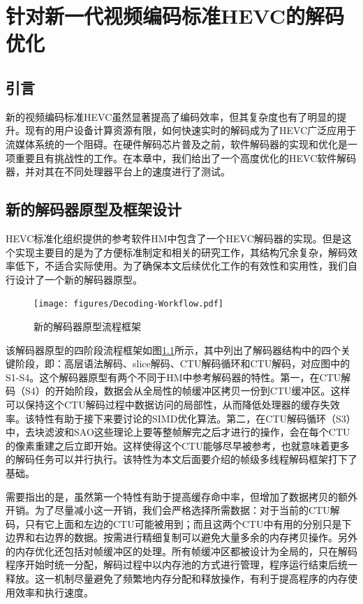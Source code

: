 \chapter{针对新一代视频编码标准HEVC的解码优化}

\section{引言}

新的视频编码标准HEVC虽然显著提高了编码效率，但其复杂度也有了明显的提升。现有的用户设备计算资源有限，如何快速实时的解码成为了HEVC广泛应用于流媒体系统的一个阻碍。在硬件解码芯片普及之前，软件解码器的实现和优化是一项重要且有挑战性的工作。在本章中，我们给出了一个高度优化的HEVC软件解码器，并对其在不同处理器平台上的速度进行了测试。

\section{新的解码器原型及框架设计}

HEVC标准化组织提供的参考软件HM中包含了一个HEVC解码器的实现。但是这个实现主要目的是为了方便标准制定和相关的研究工作，其结构冗余复杂，解码效率低下，不适合实际使用。为了确保本文后续优化工作的有效性和实用性，我们自行设计了一个新的解码器原型。

\begin{figure}[t]
	\centering
	\texttt{[image: figures/Decoding-Workflow.pdf]}\\
	\caption{\label{fig:decoding_workflow}新的解码器原型流程框架}
\end{figure}

该解码器原型的四阶段流程框架如图\ref{fig:decoding_workflow}所示，其中列出了解码器结构中的四个关键阶段，即：高层语法解码、slice解码、CTU解码循环和CTU解码，对应图中的S1-S4。这个解码器原型有两个不同于HM中参考解码器的特性。第一，在CTU解码（S4）的开始阶段，数据会从全局性的帧缓冲区拷贝一份到CTU缓冲区。这样可以保持这个CTU解码过程中数据访问的局部性，从而降低处理器的缓存失效率。该特性有助于接下来要讨论的SIMD优化算法。第二，在CTU解码循环（S3）中，去块滤波和SAO这些理论上要等整帧解完之后才进行的操作，会在每个CTU的像素重建之后立即开始。这样使得这个CTU能够尽早被参考，也就意味着更多的解码任务可以并行执行。该特性为本文后面要介绍的帧级多线程解码框架打下了基础。

需要指出的是，虽然第一个特性有助于提高缓存命中率，但增加了数据拷贝的额外开销。为了尽量减小这一开销，我们会严格选择所需数据：对于当前的CTU解码，只有它上面和左边的CTU可能被用到；而且这两个CTU中有用的分别只是下边界和右边界的数据。按需进行精细复制可以避免大量多余的内存拷贝操作。另外的内存优化还包括对帧缓冲区的处理。所有帧缓冲区都被设计为全局的，只在解码程序开始时统一分配，解码过程中以内存池的方式进行管理，程序运行结束后统一释放。这一机制尽量避免了频繁地内存分配和释放操作，有利于提高程序的内存使用效率和执行速度。

